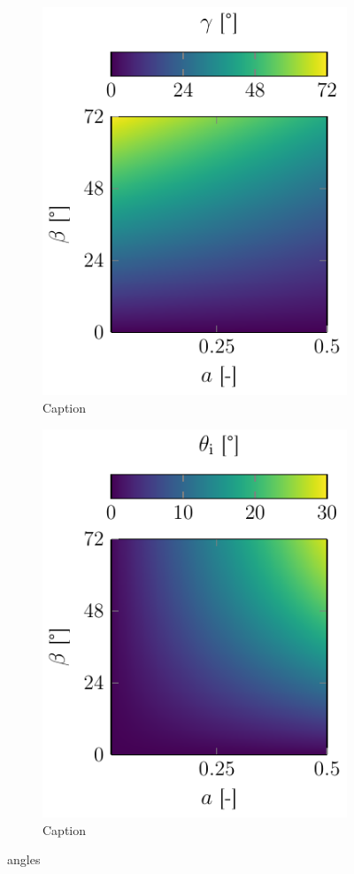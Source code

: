 \begin{figure}
  \centering
  \begin{subfigure}[b]{0.45\textwidth}
    \centering
    \includegraphics[]{Plots/cache/gamma.pdf}
    \caption{Caption}
    \label{fig:Th-gamma}
  \end{subfigure}
  \hfill
  \begin{subfigure}[b]{0.45\textwidth}
    \centering
    \includegraphics[]{Plots/cache/theta_i.pdf}
    \caption{Caption}
    \label{fig:Th-theta_i}
  \end{subfigure}
  \caption{angles}
  \label{fig:Th-gamma_theta}
\end{figure}

